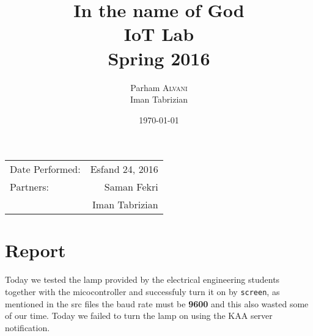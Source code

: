 \documentclass{article}
\title{In the name of God \\ IoT Lab \\ Spring 2016} %
\author{Parham \textsc{Alvani} \\ Iman Tabrizian} %
\date{\today} %
\begin{document}
\maketitle %

\begin{center}
\begin{tabular}{l r}
    Date Performed: & Esfand 24, 2016 \\ %
    Partners: & Saman Fekri \\ %
          & Iman Tabrizian \\
\end{tabular}
\end{center}



\section{Report}

Today we tested the lamp provided by the electrical engineering students together
with the micocontroller and successfuly turn it on by \texttt{screen}, as mentioned
in the src files the baud rate must be \textbf{9600} and this also wasted some
of our time. Today we failed to turn the lamp on using the KAA server notification.
\end{document}
